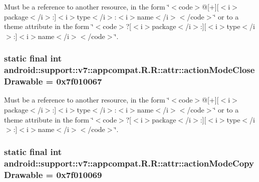 Must be a reference to another resource, in the form \char`\"{}$<$code$>$@\mbox{[}+\mbox{]}\mbox{[}$<$i$>$package$<$/i$>$:\mbox{]}$<$i$>$type$<$/i$>$:$<$i$>$name$<$/i$>$$<$/code$>$\char`\"{} or to a theme attribute in the form \char`\"{}$<$code$>$?\mbox{[}$<$i$>$package$<$/i$>$:\mbox{]}\mbox{[}$<$i$>$type$<$/i$>$:\mbox{]}$<$i$>$name$<$/i$>$$<$/code$>$\char`\"{}. \hypertarget{classandroid_1_1support_1_1v7_1_1appcompat_1_1_r_1_1attr_266b80212a3924e0825e237e313a7955}{
\subsubsection[{actionModeCloseDrawable}]{\setlength{\rightskip}{0pt plus 5cm}static final int android::support::v7::appcompat.R.R::attr::actionModeCloseDrawable = 0x7f010067}}
\label{classandroid_1_1support_1_1v7_1_1appcompat_1_1_r_1_1attr_266b80212a3924e0825e237e313a7955}


Must be a reference to another resource, in the form \char`\"{}$<$code$>$@\mbox{[}+\mbox{]}\mbox{[}$<$i$>$package$<$/i$>$:\mbox{]}$<$i$>$type$<$/i$>$:$<$i$>$name$<$/i$>$$<$/code$>$\char`\"{} or to a theme attribute in the form \char`\"{}$<$code$>$?\mbox{[}$<$i$>$package$<$/i$>$:\mbox{]}\mbox{[}$<$i$>$type$<$/i$>$:\mbox{]}$<$i$>$name$<$/i$>$$<$/code$>$\char`\"{}. \hypertarget{classandroid_1_1support_1_1v7_1_1appcompat_1_1_r_1_1attr_6457f32a05c5f5f66cbbc87829993db8}{
\subsubsection[{actionModeCopyDrawable}]{\setlength{\rightskip}{0pt plus 5cm}static final int android::support::v7::appcompat.R.R::attr::actionModeCopyDrawable = 0x7f010069}}
\label{classandroid_1_1support_1_1v7_1_1appcompat_1_1_r_1_1attr_6457f32a05c5f5f66cbbc87829993db8}


